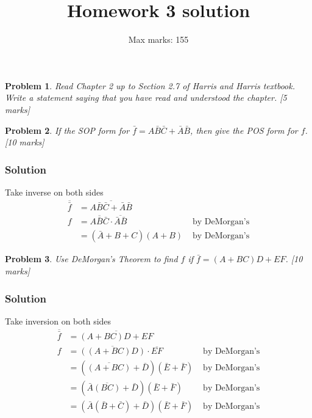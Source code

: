 \documentclass{article}
\title{Homework 3  solution}
\author{Max marks: 155}
\newtheorem{prob}{Problem}
\newcommand{\bA}{\bar{A}}
\newcommand{\bB}{\bar{B}}
\newcommand{\bC}{\bar{C}}
\begin{document}
\maketitle

\begin{prob}
  Read Chapter 2 up to Section 2.7 of Harris and Harris textbook. Write a statement saying that you have read and understood the chapter. [5 marks]
\end{prob}

\begin{prob}
If the SOP form for $ \bar{f} = A\bB\bC+\bA\bB$, then give the POS form for
$f$. [10 marks]
\end{prob}
\subsubsection*{Solution}

Take inverse on both sides
\begin{align*}
  \overline{\bar{f}} &= \overline{A\bB\bC+\bA\bB} &
  \\
  f  &= \overline{A\bB\bC} \cdot \overline{\bA\bB} & \text{ by DeMorgan's}
  \\
    &= (\bA + B + C) (A + B) & \text{ by DeMorgan's}
\end{align*}

\begin{prob}
Use DeMorgan's Theorem to find $f$  if  $\bar{f} = (A + BC)D + EF$. [10 marks]
\end{prob}

\subsubsection*{Solution}
Take inversion on both sides
\begin{align*}
  \overline{\bar{f}} &= \overline{(A+BC)D + EF} &
  \\
  f  &= \overline{((A+BC)D)} \cdot \overline{EF} & \text{ by DeMorgan's}
  \\
  &= (\overline{(A+BC)} + \bar{D}) (\bar{E}+\bar{F}) & \text{ by DeMorgan's}
  \\
  &= (\bA\overline{(BC)} + \bar{D}) (\bar{E}+\bar{F}) & \text{ by DeMorgan's}
  \\
  &= (\bA(\bB + \bC) + \bar{D}) (\bar{E}+\bar{F}) & \text{ by DeMorgan's}
\end{align*}
\end{document}
